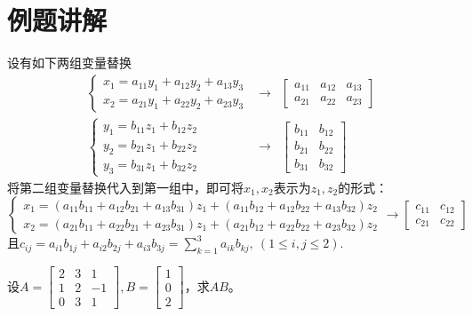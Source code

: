 
\section{例题讲解}

\begin{eg}
设有如下两组变量替换
\begin{eqnarray*}
\begin{cases}
x_1 = a_{11}y_1 + a_{12}y_2 + a_{13}y_3 \\ x_2 = a_{21}y_1 + a_{22}y_2 + a_{23}y_3
\end{cases}
& \longrightarrow &
\begin{bmatrix}
a_{11} & a_{12} & a_{13} \\ a_{21} & a_{22} & a_{23}
\end{bmatrix} \\
\begin{cases}
y_1 = b_{11}z_1 + b_{12}z_2 \\ y_2 = b_{21}z_1 + b_{22}z_2 \\ y_3 = b_{31}z_1 + b_{32}z_2
\end{cases}
& \longrightarrow &
\begin{bmatrix}
b_{11} & b_{12} \\ b_{21} & b_{22} \\ b_{31} & b_{32}
\end{bmatrix}
\end{eqnarray*}
将第二组变量替换代入到第一组中，即可将$x_1, x_2$表示为$z_1, z_2$的形式：
$$
\begin{cases}
x_1 = (a_{11}b_{11} + a_{12}b_{21} + a_{13}b_{31})z_1 + (a_{11}b_{12} + a_{12}b_{22} + a_{13}b_{32})z_2 \\ x_2 = (a_{21}b_{11} + a_{22}b_{21} + a_{23}b_{31})z_1 + (a_{21}b_{12} + a_{22}b_{22} + a_{23}b_{32})z_2
\end{cases}
\longrightarrow
\begin{bmatrix}
c_{11} & c_{12} \\ c_{21} & c_{22}
\end{bmatrix}
$$
且$c_{ij} = a_{i1}b_{1j} + a_{i2}b_{2j} + a_{i3}b_{3j} = \sum\limits_{k=1}^3 a_{ik}b_{kj}, \ (1 \leqslant i,j \leqslant 2).$
\end{eg}

\begin{eg}
设$A = \begin{bmatrix} 2 & 3 & 1 \\ 1 & 2 & -1 \\ 0 & 3 & 1\end{bmatrix}, B = \begin{bmatrix} 1 \\ 0 \\ 2 \end{bmatrix}$，求$AB$。
\end{eg}


